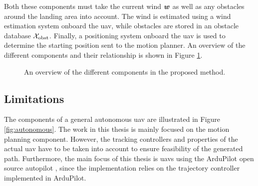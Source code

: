 Both these components must take the current wind $\boldsymbol{w}$ as well as any obstacles around the landing area into account. The wind is estimated using a wind estimation system onboard the \ac{uav}, while 
obstacles are stored in an obstacle database $\mathcal{X}_{\text{obst}}$. Finally, a positioning system onboard the \ac{uav} is used to determine the starting position sent to the motion planner. An overview of the different 
components and their relationship is shown in Figure \ref{fig:sys_overview}.

\begin{figure}[H]
    \begin{center}
    \end{center}
    \caption{An overview of the different components in the proposed method.}
    \label{fig:sys_overview}
\end{figure}

\subsection{Limitations}\label{sec:aims}
The components of a general autonomous \ac{uav} are illustrated in Figure \ref{fig:autonomous}. The work in this thesis 
is mainly focused on the motion planning component. However, the tracking controllers and properties of the actual \ac{uav} have to be taken into account 
to ensure feasibility of the generated path. Furthermore, the main focus of this thesis is \acp{uav} using the ArduPilot open source autopilot \cite{arduplane}, 
since the implementation relies on the trajectory controller implemented in ArduPilot.

